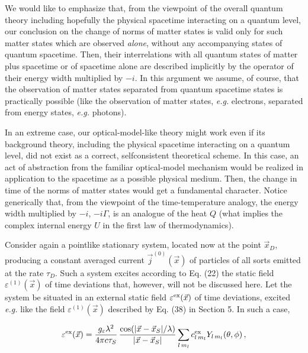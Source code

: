 \documentclass[a4paper,12pt]{article}
\begin{document}
We would like to emphasize that, from the viewpoint of the overall quantum theory including hopefully the physical spacetime interacting on a quantum level, our conclusion on the change of norms of matter states is valid only for such matter states which are observed {\it alone}, without any accompanying states of quantum spacetime. Then, their interrelations with all quantum states of matter plus spacetime or of spacetime alone are described implicitly by the operator of their energy width multiplied by $-i$. In this argument we assume, of course, that the observation of matter states separated from quantum spacetime states is practically possible (like the observation of matter states, {\it e.g.} electrons, separated from energy states, {\it e.g.} photons).

In an extreme case, our optical-model-like theory might work even if its background theory, including the physical spacetime interacting on a quantum level, did not exist as a correct, selfconsistent theoretical scheme. In this case, an act of abstraction from the familiar optical-model mechanism  would be realized in application to the spacetime as a possible physical medium. Then, the change in time of the norms of matter states would get a fundamental character. Notice generically that, from the viewpoint of the time-temperature analogy, the energy width multiplied by $-i$, $-i\Gamma$, is an analogue of the heat $Q$ (what implies the complex internal energy $U$ in the first law of thermodynamics).

\vspace{0.2cm}


\vspace{0.2cm}

Consider again a pointlike stationary system, located now at the point $\vec{x}_D$, producing a constant averaged current $\vec{j}^{(0)}(\vec{x})$ of particles of all sorts emitted at the rate $\tau_D$. Such a system excites according to Eq. (22) the static field $\varepsilon^{(1)}(\vec{x})$ of time deviations that, however, will not be discussed here. Let the system be situated in an external static 
field $\varepsilon^{\rm ex}(\vec{x})$ of time deviations, excited {\it e.g.} like the field $ \varepsilon^{ (1)}(\vec{x})$ described by Eq. (38) in Section 5. In such a case,

\begin{equation}
\varepsilon^{\rm ex}(\vec{x}) = \frac{g_\varepsilon \lambda^2}{4\pi c \tau_S}\, \frac{\cos (|\vec{x}-\vec{x}_S| /\lambda)}{|\vec{x}-\vec{x}_S|}\sum_{l\, m_l} c^{\rm ex}_{l\, m_l} Y_{l\,m_l}(\theta,\phi)\,,
\end{equation}
\end{document}
